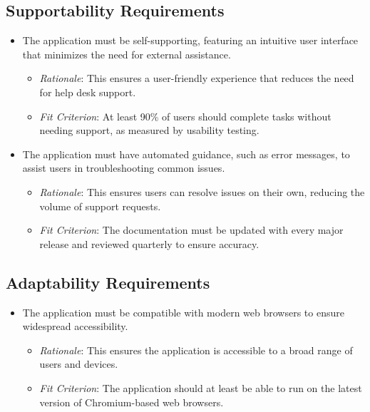 \documentclass[12pt]{article}
\begin{document}
\subsection{Supportability Requirements}
\begin{itemize}
    \item The application must be self-supporting, featuring an intuitive user
    interface that minimizes the need for external assistance.
    \begin{itemize}
        \item \textit{Rationale}: This ensures a user-friendly experience that
        reduces the need for help desk support.
        \item \textit{Fit Criterion}: At least 90\% of users should complete
        tasks without needing support, as measured by usability testing.
    \end{itemize}
    
    \item The application must have automated guidance, such as error messages,
    to assist users in troubleshooting common issues.
    \begin{itemize}
        \item \textit{Rationale}: This ensures users can resolve issues on their
        own, reducing the volume of support requests.
        \item \textit{Fit Criterion}: The documentation must be updated with
        every major release and reviewed quarterly to ensure accuracy.
    \end{itemize}
\end{itemize}

\subsection{Adaptability Requirements}
\begin{itemize}
    \item The application must be compatible with modern web browsers to ensure
    widespread accessibility.
    \begin{itemize}
        \item \textit{Rationale}: This ensures the application is accessible to
        a broad range of users and devices.
        \item \textit{Fit Criterion}: The application should at least be able to
        run on the latest version of Chromium-based web browsers.
    \end{itemize}
\end{itemize}
\end{document}
